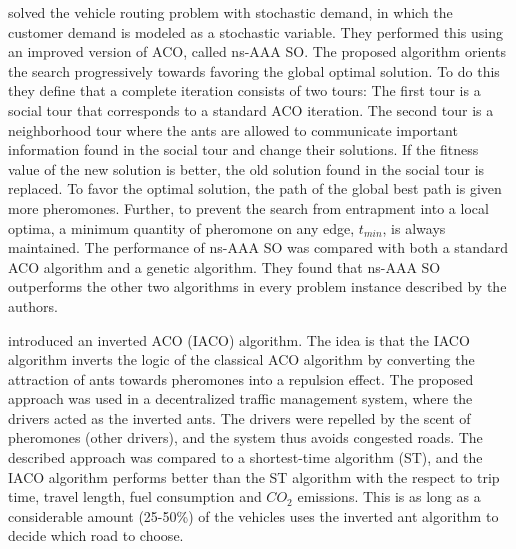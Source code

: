 \citet{tripathi09} solved the vehicle routing problem with stochastic demand, in which the customer demand is modeled as a stochastic variable. They performed this using an improved version of ACO, called ns-AAA SO. The proposed algorithm orients the search progressively towards favoring the global optimal solution. To do this they define that a complete iteration consists of two tours: The first tour is a social tour that corresponds to a standard ACO iteration. The second tour is a neighborhood tour where the ants are allowed to communicate important information found in the social tour and change their solutions. If the fitness value of the new solution is better, the old solution found in the social tour is replaced. To favor the optimal solution, the path of the global best path is given more pheromones. Further, to prevent the search from entrapment into a local optima, a minimum quantity of pheromone on any edge, $t_{min}$, is always maintained. The performance of ns-AAA SO was compared with both a standard ACO algorithm and a genetic algorithm. They found that ns-AAA SO outperforms the other two algorithms in every problem instance described by the authors.

\citet{dias14} introduced an inverted ACO (IACO) algorithm. The idea is that the IACO algorithm inverts the logic of the classical ACO algorithm by converting the attraction of ants towards pheromones into a repulsion effect. The proposed approach was used in a decentralized traffic management system, where the drivers acted as the inverted ants. The drivers were repelled by the scent of pheromones (other drivers), and the system thus avoids congested roads. The described approach was compared to a shortest-time algorithm (ST), and the IACO algorithm performs better than the ST algorithm with the respect to trip time, travel length, fuel consumption and $CO_2$ emissions. This is as long as a considerable amount (25-50\%) of the vehicles uses the inverted ant algorithm to decide which road to choose. 


